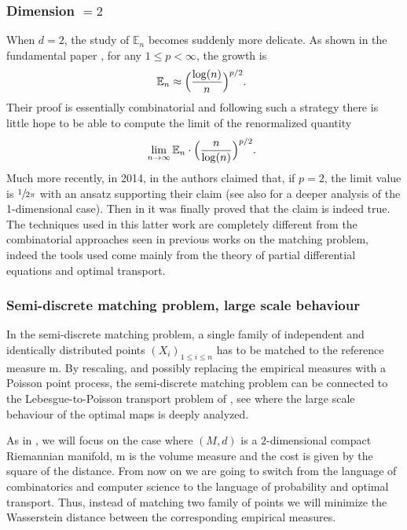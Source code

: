 \documentclass[JEP,XML,SOM,Unicode]{cedram}
\theoremstyle{plain}
\theoremstyle{definition}
\numberwithin{equation}{section}
\newcommand{\fullstop}{\ensuremath{\text{. }}}
\newcommand{\m}{\ensuremath{\mathrm m}}
\begin{document}
\subsubsection*{Dimension $=2$}
When $d=2$, the study of $\mathbb E_n$ becomes suddenly more delicate.
As shown in the fundamental paper \cite{Ajtai1984}, for any $1\le p <\infty$, the growth is
\begin{equation*}
\mathbb E_n \approx \Bigl(\frac{\log(n)}{n}\Bigr)^{p/2} \fullstop
\end{equation*}
Their proof is essentially combinatorial and following such a strategy there is little hope to
be able to compute the limit of the renormalized quantity
\begin{equation*}
\lim_{n\to\infty} \mathbb E_n\cdot \Bigl(\frac{n}{\log(n)}\Bigr)^{p/2} \fullstop
\end{equation*}
Much more recently, in 2014, in \cite{CaraccioloEtAl2014} the authors claimed that, if $p=2$, the
limit value is $\sfrac1{2\pi}$ with an ansatz supporting their claim (see also \cite{Caracciolo2014one} for
a deeper analysis of the 1-dimensional case).
Then in \cite{Ambrosio-Stra-Trevisan2018} it was finally proved that the claim is indeed true.
The techniques used in this latter work are completely different from the combinatorial approaches
seen in previous works on the matching problem, indeed the tools used come mainly from the theory
of partial differential equations and optimal transport.

\subsubsection*{Semi-discrete matching problem, large scale behaviour}
In the semi-discrete matching problem, a single family of independent and identically distributed points
$(X_i)_{1\le i\le n}$ has to be matched to the reference measure $\m$.
By rescaling, and possibly replacing the empirical measures with
a Poisson point process, the semi-discrete matching problem can be connected to
the Lebesgue-to-Poisson transport problem of \cite{HuesmannSturm2013},
see \cite{Goldman2018} where the large scale behaviour of the optimal maps
is deeply analyzed.

As in \cite{Ambrosio-Stra-Trevisan2018}, we will focus on the case where $(M, d)$ is a $2$-dimensional
compact Riemannian manifold, $\m$ is the volume measure and the cost is given by the square of the distance.
From now on we are going to switch from the language of combinatorics and computer science to the
language of probability and optimal transport. Thus, instead of matching two family of points we will
minimize the Wasserstein distance between the corresponding empirical measures.
\end{document}
